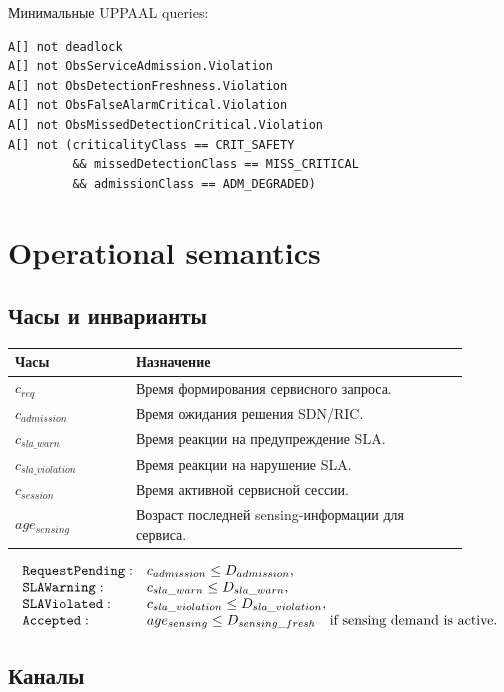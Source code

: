 \documentclass[10pt,a4paper]{article}
\newcommand{\code}[1]{\ifmmode\text{\ttfamily\detokenize{#1}}\else\texttt{\detokenize{#1}}\fi}
\begin{document}
Минимальные UPPAAL queries:
\begin{verbatim}
A[] not deadlock
A[] not ObsServiceAdmission.Violation
A[] not ObsDetectionFreshness.Violation
A[] not ObsFalseAlarmCritical.Violation
A[] not ObsMissedDetectionCritical.Violation
A[] not (criticalityClass == CRIT_SAFETY
         && missedDetectionClass == MISS_CRITICAL
         && admissionClass == ADM_DEGRADED)
\end{verbatim}

\section{Operational semantics}

\subsection{Часы и инварианты}

\begin{longtable}{p{0.24\linewidth}p{0.66\linewidth}}
\hline
\textbf{Часы} & \textbf{Назначение}\\
\hline
\(c_{req}\) & Время формирования сервисного запроса.\\
\(c_{admission}\) & Время ожидания решения SDN/RIC.\\
\(c_{sla\_warn}\) & Время реакции на предупреждение SLA.\\
\(c_{sla\_violation}\) & Время реакции на нарушение SLA.\\
\(c_{session}\) & Время активной сервисной сессии.\\
\(age_{sensing}\) & Возраст последней sensing-информации для сервиса.\\
\hline
\end{longtable}

\[
\begin{array}{ll}
\code{RequestPending}: & c_{admission}\le D_{admission},\\
\code{SLAWarning}: & c_{sla\_warn}\le D_{sla\_warn},\\
\code{SLAViolated}: & c_{sla\_violation}\le D_{sla\_violation},\\
\code{Accepted}: & age_{sensing}\le D_{sensing\_fresh}\quad \text{if sensing demand is active}.
\end{array}
\]

\subsection{Каналы}
\end{document}
